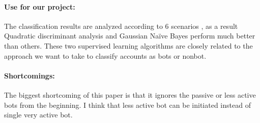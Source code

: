 \paragraph{Use for our project:}
The classification results are analyzed according to 6 scenarios , as a result Quadratic discriminant analysis and Gaussian Naïve Bayes perform much better than others. These two supervised learning algorithms are closely related to the approach we want to take to classify accounts as bots or nonbot.  
\paragraph{Shortcomings:}
The biggest shortcoming of this paper is that it ignores the passive or less active bots from the  beginning. I think that less active bot can be initiated instead of single very active bot. 
